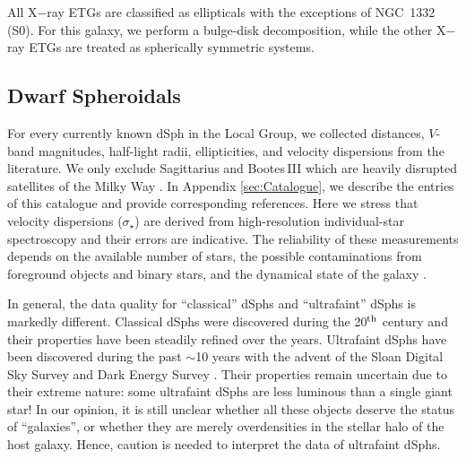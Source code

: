 \documentclass[apjl, twocolappendix]{emulateapj}
\begin{document}
All X$-$ray ETGs are classified as ellipticals with the exceptions of NGC~1332 (S0). For this galaxy, we perform a bulge-disk decomposition, while the other X$-$ray ETGs are treated as spherically symmetric systems.

\subsection{Dwarf Spheroidals}\label{sec:dSphData}

For every currently known dSph in the Local Group, we collected distances, $V$-band magnitudes, half-light radii, ellipticities, and velocity dispersions from the literature. We only exclude Sagittarius and Bootes\,III which are heavily disrupted satellites of the Milky Way \citep[MW,][]{Ibata1994, Carlin2009}. In Appendix \ref{sec:Catalogue}, we describe the entries of this catalogue and provide corresponding references. Here we stress that velocity dispersions ($\sigma_{\star}$) are derived from high-resolution individual-star spectroscopy and their errors are indicative. The reliability of these measurements depends on the available number of stars, the possible contaminations from foreground objects and binary stars, and the dynamical state of the galaxy \citep[e.g.,][]{Walker2009b, McConnachie2010, McGaugh2010, Minor2010}. 

In general, the data quality for ``classical'' dSphs and ``ultrafaint'' dSphs is markedly different. Classical dSphs were discovered during the 20$^{\rm th}$ century and their properties have been steadily refined over the years. Ultrafaint dSphs have been discovered during the past $\sim$10 years with the advent of the Sloan Digital Sky Survey \citep[e.g.,][]{Willman2005} and Dark Energy Survey \citep[e.g.,][]{2015ApJ...805..130K}. Their properties remain uncertain due to their extreme nature: some ultrafaint dSphs are less luminous than a single giant star! In our opinion, it is still unclear whether all these objects deserve the status of ``galaxies'', or whether they are merely overdensities in the stellar halo of the host galaxy. Hence, caution is needed to interpret the data of ultrafaint dSphs.
\end{document}
